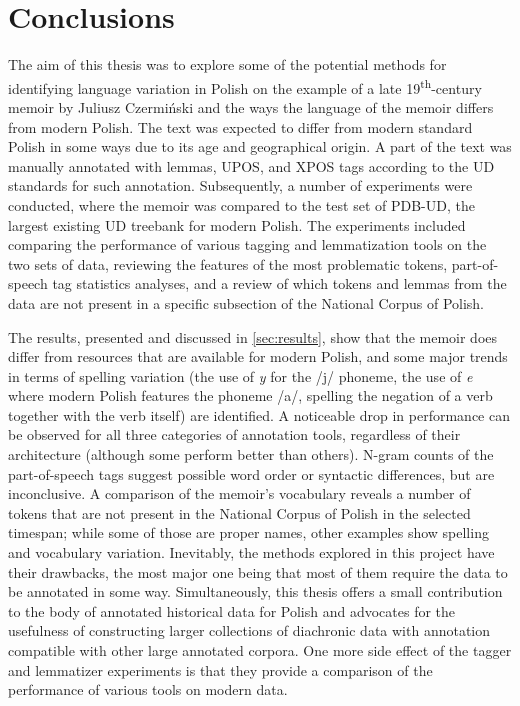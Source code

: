 \section{Conclusions}
\label{sec:conclusions}

The aim of this thesis was to explore some of the potential methods for identifying language variation in Polish on the example of a late 19\textsuperscript{th}-century memoir by Juliusz Czermiński and the ways the language of the memoir differs from modern Polish. The text was expected to differ from modern standard Polish in some ways due to its age and geographical origin. A part of the text was manually annotated with lemmas, UPOS, and XPOS tags according to the UD standards for such annotation. Subsequently, a number of experiments were conducted, where the memoir was compared to the test set of PDB-UD, the largest existing UD treebank for modern Polish. The experiments included comparing the performance of various tagging and lemmatization tools on the two sets of data, reviewing the features of the most problematic tokens, part-of-speech tag statistics analyses, and a review of which tokens and lemmas from the data are not present in a specific subsection of the National Corpus of Polish.

The results, presented and discussed in \autoref{sec:results}, show that the memoir does differ from resources that are available for modern Polish, and some major trends in terms of spelling variation (the use of \textit{y} for the /j/ phoneme, the use of \textit{e} where modern Polish features the phoneme /a/, spelling the negation of a verb together with the verb itself) are identified. A noticeable drop in performance can be observed for all three categories of annotation tools, regardless of their architecture (although some perform better than others). N-gram counts of the part-of-speech tags suggest possible word order or syntactic differences, but are inconclusive. A comparison of the memoir's vocabulary reveals a number of tokens that are not present in the National Corpus of Polish in the selected timespan; while some of those are proper names, other examples show spelling and vocabulary variation. Inevitably, the methods explored in this project have their drawbacks, the most major one being that most of them require the data to be annotated in some way. Simultaneously, this thesis offers a small contribution to the body of annotated historical data for Polish and advocates for the usefulness of constructing larger collections of diachronic data with annotation compatible with other large annotated corpora. One more side effect of the tagger and lemmatizer experiments is that they provide a comparison of the performance of various tools on modern data.

